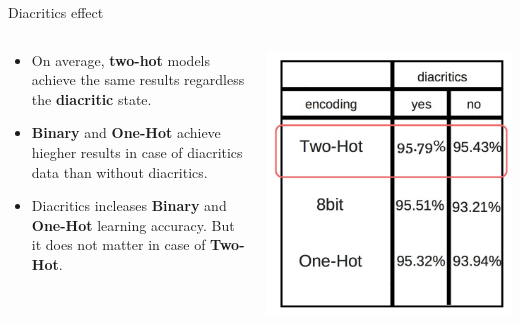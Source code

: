 \documentclass[10pt]{beamer}
\begin{document}
\begin{frame}[fragile]{Diacritics effect}
\begin{columns}
\begin{column}{0.7\textwidth}
\begin{itemize}
    \item On average, \textbf{two-hot} models achieve the same results regardless the \textbf{diacritic } state.
    \item \textbf{Binary} and \textbf{One-Hot} achieve hiegher results in case of diacritics data than without diacritics.
    \item Diacritics incleases \textbf{Binary} and \textbf{One-Hot} learning
accuracy. But it does not matter in case of \textbf{Two-Hot}.
\end{itemize}
\end{column}
\begin{column}{0.5\textwidth}
\includegraphics[scale=0.2]{fig7.jpg}
\end{column}
\end{columns}
\end{frame}
\end{document}
